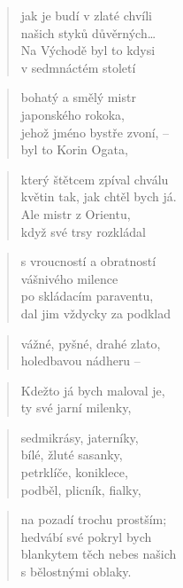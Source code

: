 \documentclass{book}
\begin{document}
\begin{verse}
jak je budí v zlaté chvíli\\
našich styků důvěrných\ldots\\
Na Východě byl to kdysi\\
v sedmnáctém století
\end{verse}
\begin{verse}
bohatý a smělý mistr\\
japonského rokoka,\\
jehož jméno bystře zvoní, --\\
byl to Korin Ogata,
\end{verse}
\begin{verse}
který štětcem zpíval chválu\\
květin tak, jak chtěl bych já.\\
Ale mistr z Orientu,\\
když své trsy rozkládal
\end{verse}
\begin{verse}
s vroucností a obratností\\
vášnivého milence\\
po skládacím paraventu,\\
dal jim vždycky za podklad
\end{verse}
\begin{verse}
vážné, pyšné, drahé zlato,\\
holedbavou nádheru --
\end{verse}
\begin{verse}
Kdežto já bych maloval je,\\
ty své jarní milenky,
\end{verse}
\begin{verse}
sedmikrásy, jaterníky,\\
bílé, žluté sasanky,\\
petrklíče, koniklece,\\
podběl, plicník, fialky,
\end{verse}
\begin{verse}
na pozadí trochu prostším;\\
hedvábí své pokryl bych\\
blankytem těch nebes našich\\
s bělostnými oblaky.
\end{verse}
\end{document}

